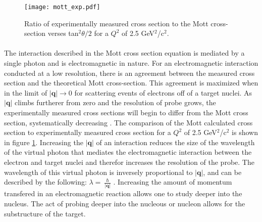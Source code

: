 \begin{figure}[]
	\centering
	\textbf{ }\par\medskip
	\texttt{[image: mott\_exp.pdf]}
	\caption{Ratio of experimentally measured cross section to the Mott  cross-section verses tan$^2\theta/2$ for a $Q^2$ of 2.5 GeV$^2$/c$^2$. \cite{EPinter}}
	\label{mott_exp}
\end{figure}

\paragraph{}The interaction described in the Mott cross section equation is mediated by a single photon and is electromagnetic in nature. For an electromagnetic interaction conducted at a low resolution, there is an agreement between the measured cross section and the theoretical Mott cross-section. This agreement is maximized when in the limit of $|\boldsymbol{q}| \rightarrow  0$ for scattering events of electrons off of a target nuclei. As $|\boldsymbol{q}|$ climbs furtherer from zero and the resolution of probe grows, the experimentally measured cross sections will begin to differ from the Mott cross section, systematically decreasing \cite{PnN}. The comparison of the Mott calculated cross section to experimentally measured cross section for a $Q^2$ of 2.5 GeV$^2$/c$^2$ is shown in figure \ref{mott_exp}. Increasing the $|\boldsymbol{q}|$ of an interaction reduces the size of the wavelength of the virtual photon that mediates the electromagnetic interaction between the electron and target nuclei and therefor increases the resolution of the probe. The wavelength of this virtual photon is inversely proportional to $|\boldsymbol{q}|$, and can be described by the following: $\lambda = \ \frac{\hbar}{|\boldsymbol{q}|}$ \cite{PnN}. Increasing the amount of momentum transfered in an electromagnetic reaction allows one to study deeper into the nucleus. The act of probing deeper into the nucleous or nucleon allows for the substructure of the target. 
